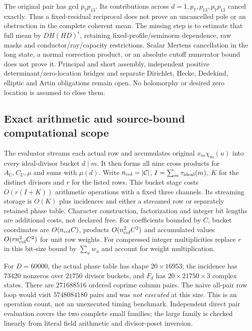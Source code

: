 \documentclass[11pt]{article}
\theoremstyle{definition}\newtheorem{definition}[theorem]{Definition}
\theoremstyle{remark}\newtheorem{remark}[theorem]{Remark}
\begin{document}
The original pair has gcd $p_7p_{13}$. Its contributions across
$d=1,p_7,p_{13},p_7p_{13}$ cancel exactly. Thus a fixed-residual
reciprocal does not prove an uncancelled pole or an obstruction in the
complete coherent mean. The missing step is to estimate that full mean
by $DH(HD)^\epsilon$, retaining fixed-profile/seminorm dependence,
raw masks and conductor/ray/capacity restrictions. Scalar Mertens
cancellation in the long state, a normal correction product, or an
absolute cutoff numerator bound does not prove it. Principal and short
assembly, independent positive determinant/zero-location bridges and
separate Dirichlet, Hecke, Dedekind, elliptic and Artin obligations remain
open. No holomorphy or desired zero location is assumed to close them.

\subsection{Exact arithmetic and source-bound computational scope}
The evaluator streams each actual row and accumulates original
$x_m\chi_m(u)$ into every ideal-divisor bucket $d\mid m$. It then
forms all nine cross products for $A_U,C_U,\mu$ and sums with $\mu(d)$.
Write $n_{\rm col}=|\mathcal C|$,
$I=\sum_m\tau_{\rm ideal}(m)$, $K$ for the distinct divisors and $r$
for the listed rows. This bucket stage costs $O(r(I+K))$ arithmetic operations with a
fixed three channels. Its streaming storage is $O(K)$ plus incidences
and either a streamed row or separately retained phase table.
Character construction, factorization and integer bit lengths are
additional costs, not declared free.
For coefficients bounded by $C$, bucket coordinates are $O(n_{\rm col}C)$,
products $O(n_{\rm col}^2C^2)$ and accumulated values
$O(r n_{\rm col}^2C^2)$ for unit row
weights. For compressed integer multiplicities replace $r$ in this
bit-size bound by $\sum_u w_u$ and account for weight multiplication.

For $D=60000$, the actual phase table has shape $20\times16953$;
the incidence has $73420$ nonzeros over $21750$ divisor buckets, and
$F_d$ has $20\times21750\times3$ complex states.
There are $271688516$ ordered coprime column pairs.
The naive all-pair row loop would visit $5748084180$ pairs and was
\emph{not executed} at this size. This is an operation count, not an
unexecuted timing benchmark. Independent direct pair evaluation covers
the two complete small families; the large family is checked linearly
from literal field arithmetic and divisor-poset inversion.
\end{document}
